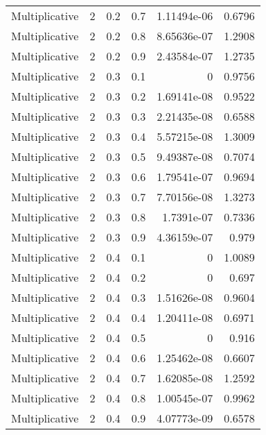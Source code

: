 \documentclass{article}
\begin{document}
\begin{longtable}[H]{lrrrrr}
 Multiplicative &       2 &   0.2 &            0.7 &   1.11494e-06 &          0.6796 \\
 Multiplicative &       2 &   0.2 &            0.8 &   8.65636e-07 &          1.2908 \\
 Multiplicative &       2 &   0.2 &            0.9 &   2.43584e-07 &          1.2735 \\
 Multiplicative &       2 &   0.3 &            0.1 &   0           &          0.9756 \\
 Multiplicative &       2 &   0.3 &            0.2 &   1.69141e-08 &          0.9522 \\
 Multiplicative &       2 &   0.3 &            0.3 &   2.21435e-08 &          0.6588 \\
 Multiplicative &       2 &   0.3 &            0.4 &   5.57215e-08 &          1.3009 \\
 Multiplicative &       2 &   0.3 &            0.5 &   9.49387e-08 &          0.7074 \\
 Multiplicative &       2 &   0.3 &            0.6 &   1.79541e-07 &          0.9694 \\
 Multiplicative &       2 &   0.3 &            0.7 &   7.70156e-08 &          1.3273 \\
 Multiplicative &       2 &   0.3 &            0.8 &   1.7391e-07  &          0.7336 \\
 Multiplicative &       2 &   0.3 &            0.9 &   4.36159e-07 &          0.979  \\
 Multiplicative &       2 &   0.4 &            0.1 &   0           &          1.0089 \\
 Multiplicative &       2 &   0.4 &            0.2 &   0           &          0.697  \\
 Multiplicative &       2 &   0.4 &            0.3 &   1.51626e-08 &          0.9604 \\
 Multiplicative &       2 &   0.4 &            0.4 &   1.20411e-08 &          0.6971 \\
 Multiplicative &       2 &   0.4 &            0.5 &   0           &          0.916  \\
 Multiplicative &       2 &   0.4 &            0.6 &   1.25462e-08 &          0.6607 \\
 Multiplicative &       2 &   0.4 &            0.7 &   1.62085e-08 &          1.2592 \\
 Multiplicative &       2 &   0.4 &            0.8 &   1.00545e-07 &          0.9962 \\
 Multiplicative &       2 &   0.4 &            0.9 &   4.07773e-09 &          0.6578 \\

\end{longtable}
\end{document}
